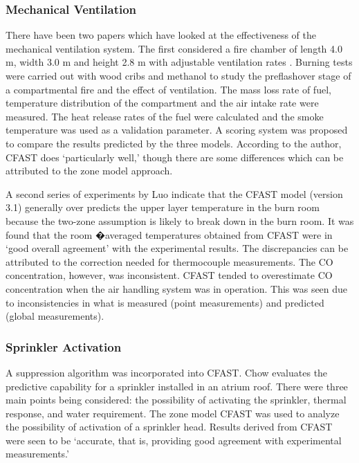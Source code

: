 \subsubsection{Mechanical Ventilation}

There have been two papers which have looked at the effectiveness of the mechanical ventilation system. The first considered a fire chamber of length 4.0 m, width 3.0 m and height 2.8 m with adjustable ventilation rates \cite{Chow:1995a}. Burning tests were carried out with wood cribs and methanol to study the preflashover stage of a compartmental fire and the effect of ventilation. The mass loss rate of fuel, temperature distribution of the compartment and the air intake rate were measured. The heat release rates of the fuel were calculated and the smoke temperature was used as a validation parameter. A scoring system was proposed to compare the results predicted by the three models. According to the author, CFAST does `particularly well,' though there are some differences which can be attributed to the zone model approach.

A second series of experiments by Luo \cite{Luo:1997} indicate that the CFAST model (version 3.1) generally over predicts the upper layer temperature in the burn room because the two-zone assumption is likely to
break down in the burn room. It was found that the room �averaged temperatures obtained from
CFAST were in `good overall agreement' with the experimental results. The discrepancies can be
attributed to the correction needed for thermocouple measurements. The CO concentration,
however, was inconsistent. CFAST tended to overestimate CO concentration when the air
handling system was in operation. This was seen due to inconsistencies in what is measured
(point measurements) and predicted (global measurements).

\subsubsection{Sprinkler Activation}


A suppression algorithm \cite{Madrzykowski:1992} was incorporated into CFAST. Chow \cite{Chow:1996a} evaluates the predictive capability for a sprinkler installed in an atrium roof. There were three main points being considered: the possibility of activating the sprinkler, thermal response, and water requirement. The zone model CFAST was used to analyze the possibility of activation of a sprinkler head. Results derived from CFAST were seen to be `accurate, that is, providing good agreement with experimental measurements.'

